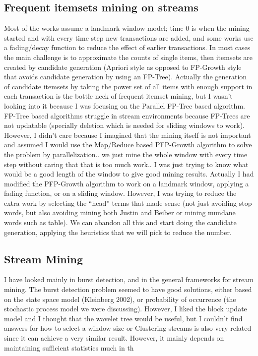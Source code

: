\documentclass[11pt]{llncs} %
\begin{document}
\subsection{Frequent itemsets mining on streams}
Most of the works assume a landmark window model; time 0 is when the mining started and with every time step new transactions are added, and some works use a fading/decay function to reduce the effect of earlier transactions. In most cases the main challenge is to approximate the counts of single items, then itemsets are created by candidate generation (Apriori style as opposed to FP-Growth style that avoids candidate generation by using an FP-Tree). Actually the generation of  candidate itemsets by taking the power set of all items with enough support in each transaction is the bottle neck of frequent itemset mining, but I wasn't looking into it because I was focusing on the Parallel FP-Tree based algorithm. FP-Tree based algorithms struggle in stream environments because FP-Trees are not updatable (specially deletion which is needed for sliding windows to work). However, I didn't care because I imagined that the mining itself is not important and assumed I would use the Map/Reduce based PFP-Growth algorithm to solve the problem by parallelization.. we just mine the whole window with every time step without caring that that is too much work.. I was just trying to know what would be a good length of the window to give good mining results. Actually I had modified the PFP-Growth algorithm to work on a landmark window, applying a fading function, or on a sliding window. However, I was trying to reduce the extra work by selecting the ``head'' terms that made sense (not just avoiding stop words, but also avoiding mining both Justin and Beiber or mining mundane words such as table). We can abandon all this and start doing the candidate generation, applying the heuristics that we will pick to reduce the number.

\subsection{Stream Mining}
I have looked mainly in burst detection, and in the general frameworks for stream mining. The burst detection problem seemed to have good solutions, either based on the state space model (Kleinberg 2002), or probability of occurrence (the stochastic process model we were discussing). However,
I liked the block update model and I thought that the wavelet tree would be useful, but I couldn't find answers for how to select a window size or  Clustering streams is also very related since it can achieve a very similar result. However, it mainly depends on maintaining sufficient statistics much in th
\end{document}
